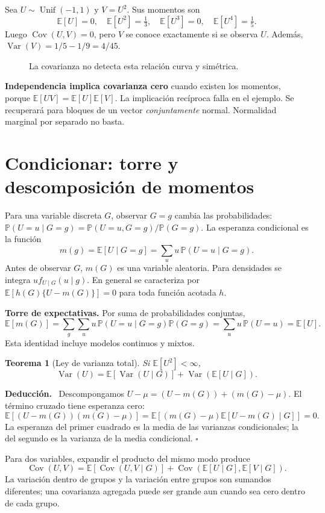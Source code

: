 \documentclass[11pt,a4paper]{article}
\newcommand{\E}{\mathbb E}
\newcommand{\Prob}{\mathbb P}
\DeclareMathOperator{\Var}{Var}
\DeclareMathOperator{\Cov}{Cov}
\newcommand{\topic}[2]{\clearpage\section{#1}\label{#2}}
\newenvironment{deduccion}{\par\textbf{Deducción.}\ }{\hfill$\square$\par}
\newtheorem{teorema}{Teorema}[section]
\theoremstyle{definition}\newtheorem{definicion}[teorema]{Definición}
\begin{document}
\begin{ejemplo}
Sea $U\sim\operatorname{Unif}(-1,1)$ y $V=U^2$. Sus momentos son
\[
\E[U]=0,\quad \E[U^2]=\tfrac13,\quad
\E[U^3]=0,\quad \E[U^4]=\tfrac15.
\]
Luego $\Cov(U,V)=0$, pero $V$ se conoce exactamente si se observa $U$.
Además, $\Var(V)=1/5-1/9=4/45$.
\end{ejemplo}
\begin{figure}[H]\centering
{}
\caption{La covarianza no detecta esta relación curva y simétrica.}
\end{figure}
\textbf{Independencia implica covarianza cero} cuando existen los momentos,
porque $\E[UV]=\E[U]\E[V]$. La implicación recíproca falla en el ejemplo.
Se recuperará para bloques de un vector \emph{conjuntamente} normal.
Normalidad marginal por separado no basta.

\topic{Condicionar: torre y descomposición de momentos}{s10}
Para una variable discreta $G$, observar $G=g$ cambia las probabilidades:
$\Prob(U=u\mid G=g)=\Prob(U=u,G=g)/\Prob(G=g)$.
La esperanza condicional es la función
\[
m(g)=\E[U\mid G=g]=\sum_u u\,\Prob(U=u\mid G=g).
\]
Antes de observar $G$, $m(G)$ es una variable aleatoria.
Para densidades se integra $u f_{U\mid G}(u\mid g)$.
En general se caracteriza por $\E[h(G)\{U-m(G)\}]=0$ para toda
función acotada $h$.

\textbf{Torre de expectativas.} Por suma de probabilidades conjuntas,
\[
\E[m(G)]
=\sum_g\sum_u u\,\Prob(U=u\mid G=g)\Prob(G=g)
=\sum_u u\,\Prob(U=u)=\E[U].
\]
Esta identidad incluye modelos continuos y mixtos.

\begin{teorema}[Ley de varianza total]
Si $\E[U^2]<\infty$,
\[
\boxed{\Var(U)=\E[\Var(U\mid G)]+\Var(\E[U\mid G])}.
\]
\end{teorema}
\begin{deduccion}
Descompongamos $U-\mu=(U-m(G))+(m(G)-\mu)$.
El término cruzado tiene esperanza cero:
\[
\E[(U-m(G))(m(G)-\mu)]
=\E[(m(G)-\mu)\E[U-m(G)\mid G]]=0.
\]
La esperanza del primer cuadrado es la media de las varianzas condicionales;
la del segundo es la varianza de la media condicional.
\end{deduccion}
Para dos variables, expandir el producto del mismo modo produce
\[
\boxed{\Cov(U,V)
=\E[\Cov(U,V\mid G)]
+\Cov(\E[U\mid G],\E[V\mid G])}.
\]
La variación dentro de grupos y la variación entre grupos son sumandos
diferentes; una covarianza agregada puede ser grande aun cuando sea cero
dentro de cada grupo.
\end{document}
